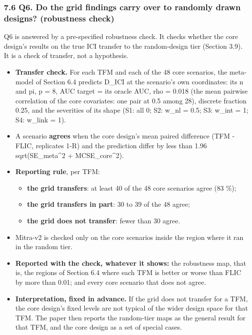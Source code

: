 \documentclass[
  10pt,
]{article}
\providecommand{\tightlist}{%
  \setlength{\itemsep}{0pt}\setlength{\parskip}{0pt}}
\begin{document}
\subsubsection{7.6 Q6. Do the grid findings carry over to
randomly drawn designs? (robustness
check)}\label{q6.-do-the-grid-findings-carry-over-to-randomly-drawn-designs-robustness-check}

Q6 is answered by a pre-specified robustness check. It
checks whether the core design's results on the true ICI
transfer to the random-design tier (Section 3.9). It is a
check of transfer, not a hypothesis.

\begin{itemize}
\tightlist
\item
  \textbf{Transfer check.} For each TFM and each of the 48
  core scenarios, the meta-model of Section 6.4 predicts
  D\_ICI at the scenario's own coordinates: its n and pi, p
  = 8, AUC target = its oracle AUC, rho = 0.018 (the mean
  pairwise correlation of the core covariates: one pair at
  0.5 among 28), discrete fraction 0.25, and the severities
  of its shape (S1: all 0; S2: w\_nl = 0.5; S3: w\_int = 1;
  S4: w\_link = 1).
\item
  A scenario \textbf{agrees} when the core design's mean
  paired difference (TFM - FLIC, replicates 1-R) and the
  prediction differ by less than 1.96 sqrt(SE\_meta\^{}2 +
  MCSE\_core\^{}2).
\item
  \textbf{Reporting rule}, per TFM:

  \begin{itemize}
  \tightlist
  \item
    \textbf{the grid transfers}: at least 40 of the 48 core
    scenarios agree (83 \%);
  \item
    \textbf{the grid transfers in part}: 30 to 39 of the 48
    agree;
  \item
    \textbf{the grid does not transfer}: fewer than 30
    agree.
  \end{itemize}
\item
  Mitra-v2 is checked only on the core scenarios inside the
  region where it ran in the random tier.
\item
  \textbf{Reported with the check, whatever it shows:} the
  robustness map, that is, the regions of Section 6.4 where
  each TFM is better or worse than FLIC by more than 0.01;
  and every core scenario that does not agree.
\item
  \textbf{Interpretation, fixed in advance.} If the grid
  does not transfer for a TFM, the core design's fixed
  levels are not typical of the wider design space for that
  TFM. The paper then reports the random-tier maps as the
  general result for that TFM, and the core design as a set
  of special cases.
\end{itemize}
\end{document}
